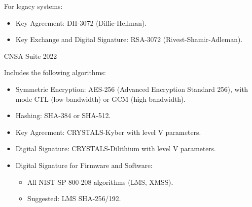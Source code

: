     For legacy systems:
    \begin{itemize}
    \item Key Agreement: DH-3072 (Diffie-Hellman).
    \item Key Exchange and Digital Signature: RSA-3072 (Rivest-Shamir-Adleman).
    \end{itemize}
    
    \vspace{1cm}
    
    \begin{center}
    CNSA Suite 2022
    \end{center}
    
    Includes the following algorithms:
    \begin{itemize}
    \item Symmetric Encryption: AES-256 (Advanced Encryption Standard 256), with mode CTL (low bandwidth) or GCM (high bandwidth).
    \item Hashing: SHA-384 or SHA-512.
    \item Key Agreement: CRYSTALS-Kyber with level V parameters.
    \item Digital Signature: CRYSTALS-Dilithium with level V parameters.
    \item Digital Signature for Firmware and Software:
    \begin{itemize}
    \item All NIST SP 800-208 algorithms (LMS, XMSS).
    \item Suggested: LMS SHA-256/192.
    \end{itemize}
    \end{itemize}